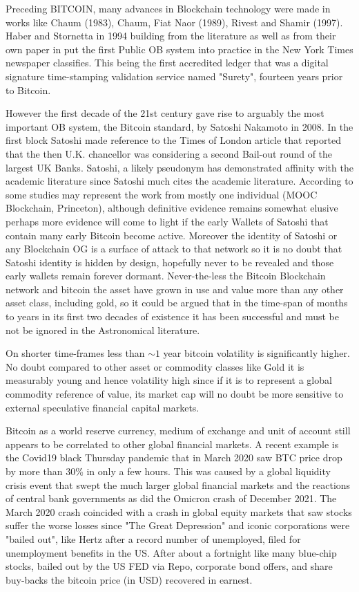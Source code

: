 \documentclass[final,5p,times,twocolumn,authoryear]{elsarticle}
\begin{document}
Preceding BITCOIN, many advances in Blockchain technology were made in works like Chaum (1983), Chaum, Fiat Naor (1989), Rivest and Shamir (1997). Haber and Stornetta in 1994 building from the literature as well as from their own paper in \cite{Haber1991wi} put the first Public OB system into practice in the New York Times newspaper classifies. This being the first accredited ledger that was a digital signature time-stamping validation service named "Surety", fourteen years prior to Bitcoin. 

However the first decade of the 21st century gave rise to arguably the most important OB system, the Bitcoin standard, by Satoshi Nakamoto in 2008.  In the first block Satoshi made reference to the Times of London article that reported that the then U.K. chancellor was considering a second Bail-out round of the largest UK Banks. Satoshi, a likely pseudonym has demonstrated affinity with the academic literature since Satoshi much cites the academic literature. According to some studies may represent the work from mostly one individual (MOOC Blockchain, Princeton), although definitive evidence remains somewhat elusive perhaps more evidence will come to light if the early Wallets of Satoshi that contain many early Bitcoin become active. Moreover the identity of Satoshi or any Blockchain OG is a surface of attack to that network so it is no doubt that Satoshi identity is hidden by design, hopefully never to be revealed and those early wallets remain forever dormant. Never-the-less the Bitcoin Blockchain network and bitcoin the asset have grown in use and value more than any other asset class, including gold, so it could be argued that in the time-span of months to years in its first two decades of existence it has been successful and must be not be ignored in the Astronomical literature.

On shorter time-frames less than $\sim 1$ year bitcoin volatility is significantly higher. No doubt compared to other asset or commodity classes like Gold it is measurably young and hence volatility high since if it is to represent a global commodity reference of value, its market cap will no doubt be more sensitive to external speculative financial capital markets. 

Bitcoin as a world reserve currency, medium of exchange and unit of account still appears to be correlated to other global financial markets. A recent example is the Covid19 black Thursday pandemic that in March 2020 saw BTC price drop by more than 30\% in only a few hours. This was caused by a global liquidity crisis event that swept the much larger global financial markets and the reactions of central bank governments as did the Omicron crash of December 2021. The March 2020 crash coincided with a crash in global equity markets that saw stocks suffer the worse losses since "The Great Depression" and iconic corporations were "bailed out", like Hertz after a record number of unemployed, filed for unemployment benefits in the US. After about a fortnight like many blue-chip stocks, bailed out by the US FED via Repo, corporate bond offers, and share buy-backs the bitcoin price (in USD) recovered in earnest.
 
\end{document}
